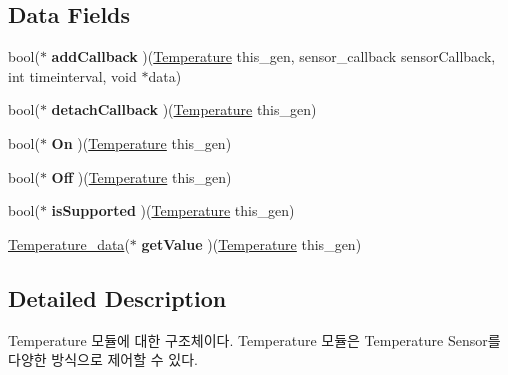 \subsection*{Data Fields}
\begin{DoxyCompactItemize}
\item 
\hypertarget{struct__Temperature_ac1ecaf34baaf733256d86f91084082a0}{bool($\ast$ {\bfseries add\-Callback} )(\hyperlink{struct__Temperature}{Temperature} this\-\_\-gen, sensor\-\_\-callback sensor\-Callback, int timeinterval, void $\ast$data)}\label{struct__Temperature_ac1ecaf34baaf733256d86f91084082a0}

\item 
\hypertarget{struct__Temperature_a2106e1bef363a8d8961ff5e34787353c}{bool($\ast$ {\bfseries detach\-Callback} )(\hyperlink{struct__Temperature}{Temperature} this\-\_\-gen)}\label{struct__Temperature_a2106e1bef363a8d8961ff5e34787353c}

\item 
\hypertarget{struct__Temperature_ae614da6efd4e9cc8673bfee276c818c9}{bool($\ast$ {\bfseries On} )(\hyperlink{struct__Temperature}{Temperature} this\-\_\-gen)}\label{struct__Temperature_ae614da6efd4e9cc8673bfee276c818c9}

\item 
\hypertarget{struct__Temperature_a6e8f503af581cc4ea362f230b1c2a8cd}{bool($\ast$ {\bfseries Off} )(\hyperlink{struct__Temperature}{Temperature} this\-\_\-gen)}\label{struct__Temperature_a6e8f503af581cc4ea362f230b1c2a8cd}

\item 
\hypertarget{struct__Temperature_a066c1b02fe31ddfb64ef783d1fefd1a2}{bool($\ast$ {\bfseries is\-Supported} )(\hyperlink{struct__Temperature}{Temperature} this\-\_\-gen)}\label{struct__Temperature_a066c1b02fe31ddfb64ef783d1fefd1a2}

\item 
\hypertarget{struct__Temperature_a660cf710a2d1e34072bd9a1ab95d368b}{\hyperlink{Sensor_8h_d7/d14/struct__Temperature__data}{Temperature\-\_\-data}($\ast$ {\bfseries get\-Value} )(\hyperlink{struct__Temperature}{Temperature} this\-\_\-gen)}\label{struct__Temperature_a660cf710a2d1e34072bd9a1ab95d368b}

\end{DoxyCompactItemize}


\subsection{Detailed Description}
Temperature 모듈에 대한 구조체이다. Temperature 모듈은 Temperature Sensor를 다양한 방식으로 제어할 수 있다. 

